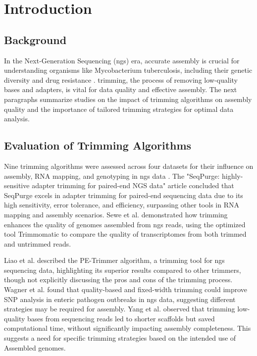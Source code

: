 \chapter{Introduction}
\section{Background}

In the Next-Generation Sequencing (\gls{ngs}) era, accurate \gls{assembly} is crucial \cite{Elaine2015} \cite{Lavanya2021} \cite{Wang2017} \cite{Jones2004} for understanding organisms like Mycobacterium tuberculosis, including their genetic diversity and drug resistance \cite{Heupink2021} \cite{Netikul2022} \cite{SanchezCorrales2021}. \gls{trimming}, the process of removing low-quality bases and adapters, is vital for data quality and effective \gls{assembly}. The next paragraphs summarize studies on the impact of trimming algorithms on \gls{assembly} quality and the importance of tailored trimming strategies for optimal data analysis.

\section{Evaluation of Trimming Algorithms}

Nine trimming algorithms were assessed across four datasets for their influence on \gls{assembly}, RNA mapping, and genotyping in \gls{ngs} data \cite{Fabbro2013}. The "SeqPurge: highly-sensitive adapter trimming for paired-end NGS data" article \cite{Sturm2016} concluded that SeqPurge excels in adapter trimming for paired-end sequencing data due to its high sensitivity, error tolerance, and efficiency, surpassing other tools in RNA mapping and \gls{assembly} scenarios. Sewe et al. \cite{Sewe2022} demonstrated how \gls{trimming} enhances the quality of \gls{genome}s assembled from \gls{ngs} \gls{read}s, using the optimized tool Trimmomatic to compare the quality of transcriptomes from both trimmed and untrimmed \gls{read}s.

Liao et al. \cite{Liao2020} described the PE-Trimmer algorithm, a trimming tool for \gls{ngs} sequencing data, highlighting its superior results compared to other trimmers, though not explicitly discussing the pros and cons of the \gls{trimming} process. Wagner et al. \cite{Wagner2021} found that quality-based and fixed-width \gls{trimming} could improve SNP analysis in enteric pathogen outbreaks in \gls{ngs} data, suggesting different strategies may be required for \gls{assembly}. Yang et al. \cite{Yang2019} observed that \gls{trimming} low-quality bases from sequencing \gls{read}s led to shorter \gls{scaffold}s but saved computational time, without significantly impacting \gls{assembly} completeness. This suggests a need for specific trimming strategies based on the intended use of Assembled \gls{genome}s.

